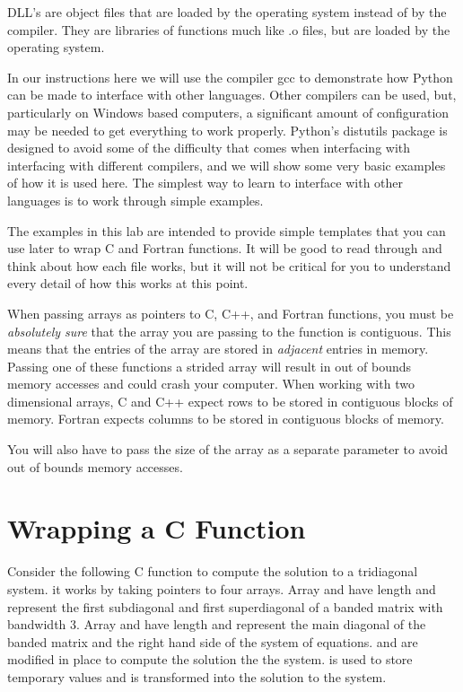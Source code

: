 DLL's are object files that are loaded by the operating system instead of by the compiler.
They are libraries of functions much like .o files, but are loaded by the operating system.

In our instructions here we will use the compiler gcc to demonstrate how Python can be made to interface with other languages.
Other compilers can be used, but, particularly on Windows based computers, a significant amount of configuration may be needed to get everything to work properly.
Python's distutils package is designed to avoid some of the difficulty that comes when interfacing with interfacing with different compilers, and we will show some very basic examples of how it is used here.
The simplest way to learn to interface with other languages is to work through simple examples.
\begin{info}
The examples in this lab are intended to provide simple templates that you can use later to wrap C and Fortran functions.
It will be good to read through and think about how each file works, but it will not be critical for you to understand every detail of how this works at this point.
\end{info}

\begin{warn}
When passing arrays as pointers to C, C++, and Fortran functions, you must be \emph{absolutely sure} that the array you are passing to the function is contiguous.
This means that the entries of the array are stored in \emph{adjacent} entries in memory.
Passing one of these functions a strided array will result in out of bounds memory accesses and could crash your computer.
When working with two dimensional arrays, C and C++ expect rows to be stored in contiguous blocks of memory.
Fortran expects columns to be stored in contiguous blocks of memory.

You will also have to pass the size of the array as a separate parameter to avoid out of bounds memory accesses.
\end{warn}

\section*{Wrapping a C Function}

Consider the following C function to compute the solution to a tridiagonal system.
it works by taking pointers to four arrays.
Array  and  have length  and represent the first subdiagonal and first superdiagonal of a banded matrix with bandwidth 3.
Array  and  have length  and represent the main diagonal of the banded matrix and the right hand side of the system of equations.
 and  are modified in place to compute the solution the the system.
 is used to store temporary values and  is transformed into the solution to the system.

